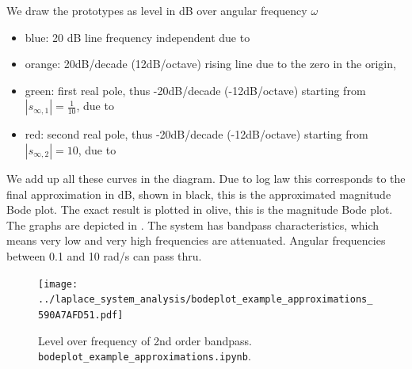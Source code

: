 \begin{Loesung}

We draw the prototypes as level in dB over angular frequency $\omega$
\begin{itemize}
\item blue: 20 dB line frequency independent due to 
\item orange: 20dB/decade (12dB/octave) rising line due to the zero in the origin,
\item green: first real pole, thus -20dB/decade (-12dB/octave) starting from $|s_{\infty,1}| = \frac{1}{10}$, due to
\item red: second real pole, thus -20dB/decade (-12dB/octave) starting from $|s_{\infty,2}| = 10$, due to
\end{itemize}
We add up all these curves in the diagram. Due to log law this corresponds to the final approximation
in dB, shown in black, this is the approximated magnitude Bode plot.
The exact result is plotted in olive, this is the magnitude Bode plot.
The graphs are depicted in .
The system has bandpass characteristics, which means very low and very high
frequencies are attenuated. Angular frequencies between 0.1 and 10 rad/s can pass
thru.
\end{Loesung}

\begin{figure}[h!]
\centering
\texttt{[image: ../laplace\_system\_analysis/bodeplot\_example\_approximations\_590A7AFD51.pdf]}
\caption{Level over frequency of 2nd order bandpass.
\texttt{bodeplot\_example\_approximations.ipynb}.}
\label{fig:bodeplot_example_approximations_590A7AFD51}
\end{figure}
















\clearpage
